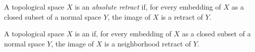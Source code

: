 \documentclass[12pt]{article}
\begin{document}
A topological space $X$ is an \emph{absolute retract} if, for every embedding of $X$ as a closed subset of a normal space $Y$, the image of $X$ is a retract of $Y$.

A topological space $X$ is an  if, for every embedding of $X$ as a closed subset of a normal space $Y$, the image of $X$ is a neighborhood retract of $Y$.

\end{document}
